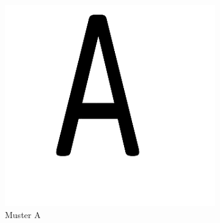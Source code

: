 \begin{figure}[H]
\begin{subfigure}{0.3\textwidth}
\includegraphics[width=0.95\linewidth]{assets/informatik-prototyp/opencv/target_node_detection/a.png} 
\caption{Muster A}
\label{fig:image-a}
\end{subfigure}
\begin{subfigure}{0.3\textwidth}

\end{subfigure}
\end{figure}
